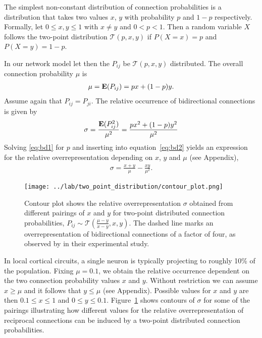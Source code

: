 
The simplest non-constant distribution of connection probabilities is a distribution that takes two values $x$, $y$ with probability $p$ and $1-p$ respectively. Formally, let $0 \leq x,y \leq 1$ with $x \neq y$  and $0 < p < 1$. Then a random variable $X$ follows the two-point distribution %
$\mathcal{T}(p,x,y)$ if $P(X=x)=p$ and $P(X=y) = 1-p$. 

In our network model let then the $P_{ij}$ be $\mathcal{T}(p,x,y)$ distributed. The overall connection probability $\mu$ is
\begin{align}
\mu = \operatorname{\mathbf{E}}(P_{ij}) = px + (1-p)y. \label{eq:bd1}
\end{align}
Assume again that $P_{ij} = P_{ji}$. The relative occurrence of bidirectional connections is given by
\begin{align}
  \sigma = \frac{\operatorname{\mathbf{E}}(P_{ij}^2)}{\mu^2} = \frac{p x^2 + (1-p) y^2}{\mu^2} \label{eq:bd2}
\end{align}
Solving \eqref{eq:bd1} for $p$ and inserting into equation~\eqref{eq:bd2} yields an expression for the relative overrepresentation depending on $x$, $y$ and $\mu$ (see Appendix),
\begin{align}
\sigma = \frac{x+y}{\mu} - \frac{xy}{\mu^2}.
\end{align}

\begin{figure}[h!]
\centering
\texttt{[image: ../lab/two\_point\_distribution/contour\_plot.png]}
\caption{Contour plot shows the relative overrepresentation $\sigma$ obtained from different pairings of $x$ and $y$ for two-point distributed connection probabilities, $P_{ij} \sim \mathcal{T}(\frac{\mu-y}{x-y},x,y)$. The dashed line marks an overrepresentation of bidirectional connections of a factor of four, as observed by \cite{Song2005} in their experimental study.}
\label{fig:tp}
\end{figure}

In local cortical circuits, a single neuron is typically projecting to roughly 10\% of the population. Fixing $\mu = 0.1$, we obtain the relative occurrence dependent on the two connection probability values $x$ and $y$. Without restriction we can assume $x \geq \mu$ and it follows that $y \leq \mu$ (see Appendix). Possible values for $x$ and $y$ are then $0.1 \leq x \leq 1$ and $0 \leq y \leq 0.1$. Figure~\ref{fig:tp} shows contours of $\sigma$ for some of the pairings illustrating how different values for the relative overrepresentation of reciprocal connections can be induced by a two-point distributed connection probabilities.  





